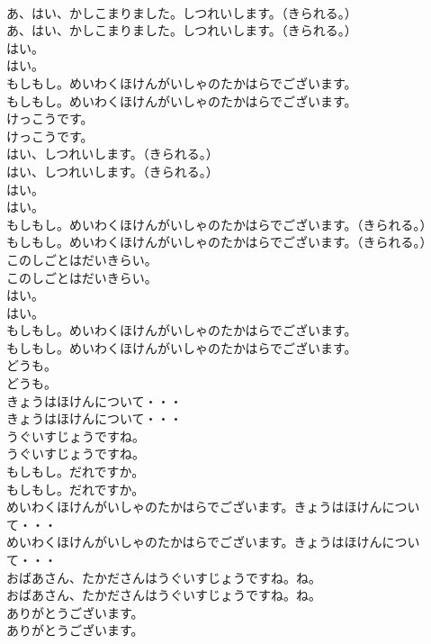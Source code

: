 \documentclass[8pt]{extreport}
\begin{document}
\begin{CJK}{UTF8}{min}
\\	あ、はい、かしこまりました。しつれいします。（きられる。）	
\\	あ、はい、かしこまりました。しつれいします。（きられる。） 
\\	はい。	
\\	はい。 
\\	もしもし。めいわくほけんがいしゃのたかはらでございます。	
\\	もしもし。めいわくほけんがいしゃのたかはらでございます。 
\\	けっこうです。	
\\	けっこうです。 
\\	はい、しつれいします。（きられる。）	
\\	はい、しつれいします。（きられる。） 
\\	はい。	
\\	はい。 
\\	もしもし。めいわくほけんがいしゃのたかはらでございます。（きられる。）	
\\	もしもし。めいわくほけんがいしゃのたかはらでございます。（きられる。） 
\\	このしごとはだいきらい。	
\\	このしごとはだいきらい。 
\\	はい。	
\\	はい。 
\\	もしもし。めいわくほけんがいしゃのたかはらでございます。	
\\	もしもし。めいわくほけんがいしゃのたかはらでございます。 
\\	どうも。	
\\	どうも。 
\\	きょうはほけんについて・・・	
\\	きょうはほけんについて・・・ 
\\	うぐいすじょうですね。	
\\	うぐいすじょうですね。 
\\	もしもし。だれですか。	
\\	もしもし。だれですか。 
\\	めいわくほけんがいしゃのたかはらでございます。きょうはほけんについて・・・	
\\	めいわくほけんがいしゃのたかはらでございます。きょうはほけんについて・・・ 
\\	おばあさん、たかださんはうぐいすじょうですね。ね。	
\\	おばあさん、たかださんはうぐいすじょうですね。ね。 
\\	ありがとうございます。	
\\	ありがとうございます。 

\end{CJK}
\end{document}

